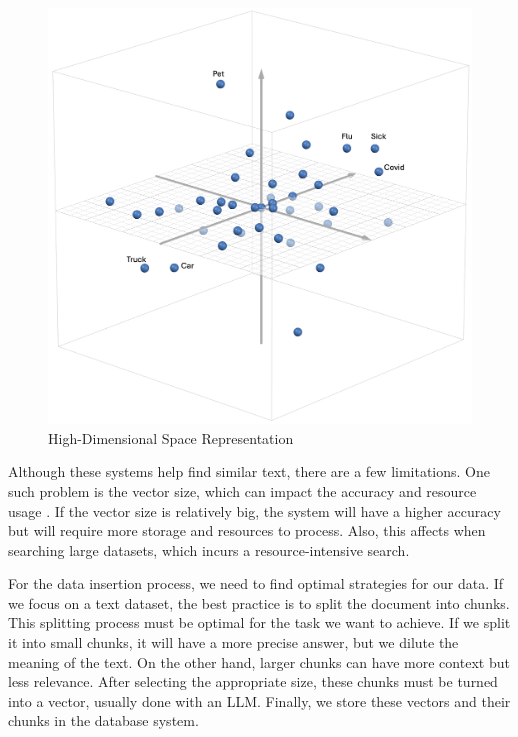   \begin{figure}[!h]
    \centering
        \includegraphics[width=0.85\linewidth]{images/Vector_example_update.png}
        \caption{High-Dimensional Space Representation}
        \label{vector_space}
\end{figure}

Although these systems help find similar text, there are a few limitations. One such problem is the vector size, which can impact the accuracy and resource usage \cite{han2023comprehensivesurveyvectordatabase}. If
the vector size is relatively big, the system will have a higher accuracy but will require more storage and resources to process. Also, this affects when searching large datasets, which incurs a resource-intensive search.
 
For the data insertion process, we need to find optimal strategies for our data. If we focus on a text dataset, the best practice is to split the document into chunks. This splitting process must be optimal for the task we want
to achieve. If we split it into small chunks, it will have a more precise answer, but we dilute the meaning of the text. On the other hand, larger chunks can have more context but less relevance. After selecting the appropriate
size, these chunks must be turned into a vector, usually done with an LLM. Finally, we store these vectors and their chunks in the database system. 

